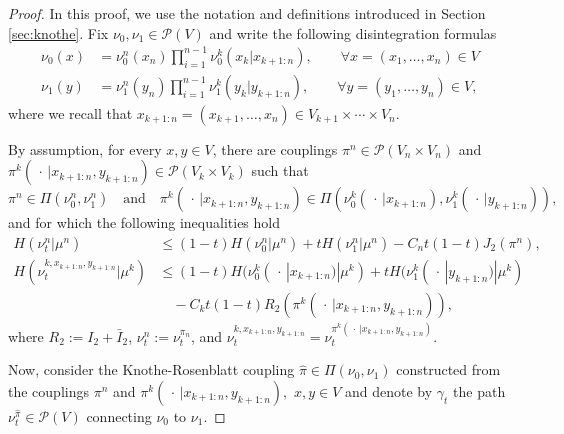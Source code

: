\documentclass[11pt]{amsart}
\numberwithin{equation}{section}
\begin{document}
\begin{proof}
In this proof, we use the notation and definitions introduced in Section \ref{sec:knothe}.
Fix $\nu_0,\nu_1 \in  \mathcal{P}(V)$ and write the following disintegration formulas 
\begin{align*}
\nu_0(x)&=\nu_0^n(x_n)\prod_{i=1}^{n-1} \nu_0^k(x_k | x_{k+1 : n}),\qquad \forall x=(x_1,\ldots,x_n)\in V\\
\nu_1(y)&=\nu_1^n(y_n)\prod_{i=1}^{n-1} \nu_1^k(y_k | y_{k+1 : n}),\qquad \forall y=(y_1,\ldots,y_n)\in V,
\end{align*}
where we recall that $x_{k+1:n}=(x_{k+1},\ldots,x_{n})\in V_{k+1}\times \cdots\times V_{n}.$

By assumption, for every $x,y \in V$, there are couplings $\pi^n\in \mathcal{P}(V_n\times V_n)$ and $\pi^k(\,\cdot\, | x_{k+1:n},y_{k+1:n}) \in \mathcal{P}(V_k\times V_k)$ such that 
$$\pi^n\in\Pi(\nu_0^n,\nu_1^n)\quad\text{and}\quad \pi^k(\,\cdot\, | x_{k+1:n},y_{k+1:n})\in\Pi(\nu_0^k(\,\cdot\, |x_{k+1:n}),\nu_1^k(\,\cdot\, |y_{k+1:n})),$$
and for which the following inequalities hold
\begin{align*}
H(\nu_t^{n}|\mu^n)
&\leq 
(1-t)H(\nu_0^n | \mu^n) + tH(\nu_1^n | \mu^n) - C_nt(1-t)J_2(\pi^n),\\
H(\nu_t^{k, x_{k+1:n},y_{k+1:n}}|\mu^k)
&\leq (1-t)H(\nu_0^k(\,\cdot\, |x_{k+1:n}) | \mu^k) + tH(\nu_1^k(\,\cdot\, | y_{k+1:n}) | \mu^k) \\
&\quad
- C_kt(1-t)R_2(\pi^k(\,\cdot\,|x_{k+1:n}, y_{k+1:n})),
\end{align*}
where $R_2:=I_2+\bar{I}_2$, $\nu_t^{n}:=\nu_t^{\pi_n}$, and $\nu_t^{k, x_{k+1:n},y_{k+1:n}}=\nu_t^{\pi^k(\,\cdot\, | x_{k+1:n},y_{k+1:n})}.$

Now, consider the Knothe-Rosenblatt coupling $\hat{\pi}\in \Pi(\nu_0,\nu_1)$ constructed from the couplings $\pi^n$ and $\pi^k(\,\cdot\,| x_{k+1:n}, y_{k+1:n}),$ $x,y\in V$ and denote by $\gamma_t$ the path $\nu_t^{\hat{\pi}}\in \mathcal{P}(V)$ connecting $\nu_0$ to $\nu_1.$


\end{proof}
\end{document}
